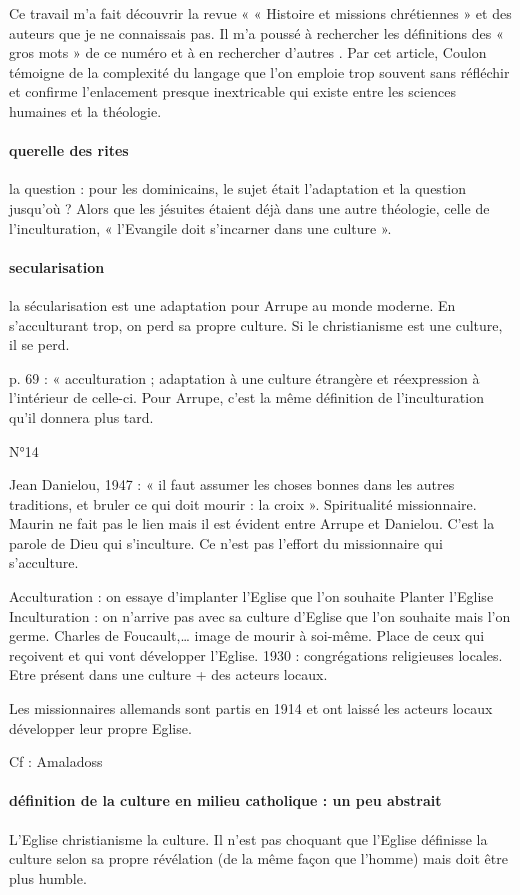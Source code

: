 Ce travail m’a fait découvrir la revue « « Histoire et missions chrétiennes » et des auteurs que je ne connaissais pas.  Il m’a poussé à rechercher les définitions des « gros mots » de ce numéro et à en rechercher d’autres . Par cet article, Coulon témoigne de la complexité du langage que l’on emploie trop souvent sans réfléchir et confirme l’enlacement presque inextricable qui existe entre les sciences humaines et la théologie.   





\paragraph{querelle des rites} la question : pour les dominicains, le sujet était l’adaptation et la question jusqu’où ? Alors que les jésuites étaient déjà dans une autre théologie, celle de l’inculturation, « l’Evangile doit s’incarner dans une culture ».

\paragraph{secularisation} la sécularisation est une adaptation pour Arrupe au monde moderne. En s’acculturant trop, on perd sa propre culture. Si le christianisme est une culture, il se perd. 

p. 69 : « acculturation ; adaptation à une culture étrangère et réexpression à l’intérieur de celle-ci.
Pour Arrupe, c’est la même définition de l’inculturation qu’il donnera plus tard. 

N°14  


Jean Danielou, 1947 : « il faut assumer les choses bonnes dans les autres traditions, et bruler ce qui doit mourir : la croix ». Spiritualité missionnaire. Maurin ne fait pas le lien mais il est évident entre Arrupe et Danielou.
C’est la parole de Dieu qui s’inculture. Ce n’est pas l’effort du missionnaire qui s’acculture.

Acculturation : on essaye d’implanter l’Eglise que l’on souhaite
Planter l’Eglise
Inculturation : on n’arrive pas avec sa culture d’Eglise que l’on souhaite mais l’on germe. Charles de Foucault,… image de mourir à soi-même.
Place de ceux qui reçoivent et qui vont développer l’Eglise. 1930 : congrégations religieuses locales.
Etre présent dans une culture + des acteurs locaux.
\begin{Ex}
Les missionnaires allemands sont partis en 1914 et ont laissé les acteurs locaux développer leur propre Eglise.
\end{Ex}
Cf : Amaladoss

\paragraph{définition de la culture en milieu catholique : un peu abstrait} L’Eglise christianisme la culture. 
Il n’est pas choquant que l’Eglise définisse la culture selon sa propre révélation (de la même façon que l’homme) mais doit être plus humble.


